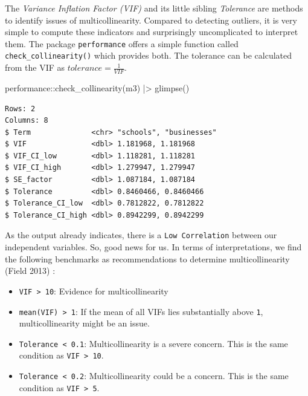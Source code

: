 \documentclass[
  letterpaper,
]{krantz}
\makeatletter
\newenvironment{Shaded}{\begin{snugshade}}{\end{snugshade}}
\newcommand{\FunctionTok}[1]{\textcolor[rgb]{0.28,0.35,0.67}{#1}}
\newcommand{\NormalTok}[1]{\textcolor[rgb]{0.00,0.23,0.31}{#1}}
\newcommand{\SpecialCharTok}[1]{\textcolor[rgb]{0.37,0.37,0.37}{#1}}
\newenvironment{kframe}{%
\medskip{}
\setlength{\fboxsep}{.8em}
 \def\at@end@of@kframe{}%
 \ifinner\ifhmode%
  \def\at@end@of@kframe{\end{minipage}}%
  \begin{minipage}{\columnwidth}%
 \fi\fi%
 \def\FrameCommand##1{\hskip\@totalleftmargin \hskip-\fboxsep
 \colorbox{shadecolor}{##1}\hskip-\fboxsep
     \hskip-\linewidth \hskip-\@totalleftmargin \hskip\columnwidth}%
 \MakeFramed {\advance\hsize-\width
   \@totalleftmargin\z@ \linewidth\hsize
   \@setminipage}}%
 {\par\unskip\endMakeFramed%
 \at@end@of@kframe}
\renewenvironment{Shaded}{\begin{kframe}}{\end{kframe}}
\makeatother
\begin{document}
The \emph{Variance Inflation Factor (VIF)} and its little sibling
\emph{Tolerance} are methods to identify issues of multicollinearity.
Compared to detecting outliers, it is very simple to compute these
indicators and surprisingly uncomplicated to interpret them. The package
\texttt{performance} offers a simple function called
\texttt{check\_collinearity()} which provides both. The tolerance can be
calculated from the VIF as \(tolerance = \frac{1}{VIF}\).

\begin{Shaded}
\begin{Highlighting}[]
\NormalTok{performance}\SpecialCharTok{::}\FunctionTok{check\_collinearity}\NormalTok{(m3) }\SpecialCharTok{|\textgreater{}}
  \FunctionTok{glimpse}\NormalTok{()}
\end{Highlighting}
\end{Shaded}

\begin{verbatim}
Rows: 2
Columns: 8
$ Term              <chr> "schools", "businesses"
$ VIF               <dbl> 1.181968, 1.181968
$ VIF_CI_low        <dbl> 1.118281, 1.118281
$ VIF_CI_high       <dbl> 1.279947, 1.279947
$ SE_factor         <dbl> 1.087184, 1.087184
$ Tolerance         <dbl> 0.8460466, 0.8460466
$ Tolerance_CI_low  <dbl> 0.7812822, 0.7812822
$ Tolerance_CI_high <dbl> 0.8942299, 0.8942299
\end{verbatim}

As the output already indicates, there is a \texttt{Low\ Correlation}
between our independent variables. So, good news for us. In terms of
interpretations, we find the following benchmarks as recommendations to
determine multicollinearity (Field 2013) :

\begin{itemize}
\item
  \texttt{VIF\ \textgreater{}\ 10}: Evidence for multicollinearity
\item
  \texttt{mean(VIF)\ \textgreater{}\ 1}: If the mean of all VIFs lies
  substantially above \texttt{1}, multicollinearity might be an issue.
\item
  \texttt{Tolerance\ \textless{}\ 0.1}: Multicollinearity is a severe
  concern. This is the same condition as
  \texttt{VIF\ \textgreater{}\ 10}.
\item
  \texttt{Tolerance\ \textless{}\ 0.2}: Multicollinearity could be a
  concern. This is the same condition as
  \texttt{VIF\ \textgreater{}\ 5}.
\end{itemize}
\end{document}
